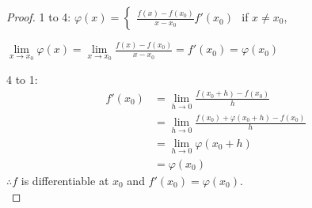 \documentclass[12pt]{article}
\theoremstyle{plain}
\renewcommand{\phi}{\varphi}
\newcommand{\dlim}{\displaystyle\lim\limits}
\begin{document}
    \begin{proof} 
        1 to 4: $\phi(x) =\begin{cases}
            \frac{f(x) -f(x_0)}{x-x_0}
            f'(x_0) 
        \end{cases}$ if $x\neq x_0$, 

        $\dlim_{x\to x_0} \phi(x) = \dlim_{x\to x_0} \frac{f(x)-f(x_0)}{x-x_0}
        =f'(x_0) =\phi(x_0)$

        4 to 1: 
        \begin{align*}
            f'(x_0)&=\dlim_{h\to 0} \frac{f(x_0+h) -f(x_0)}h\\
            &=\dlim_{h\to 0} \frac{f(x_0)+\phi(x_0+h)-f(x_0)}h \\
            &=\dlim_{h\to 0} \phi(x_0+h)\\
            &=\phi(x_0)
        \end{align*} 
        $\therefore f$ is differentiable at $x_0$ and $f'(x_0) = \phi(x_0)$.\\
    \end{proof}
\end{document}
